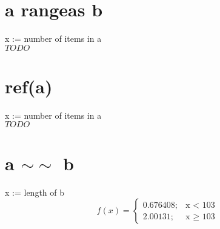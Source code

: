 \documentclass[12pt]{article}
\begin{document}
	\section{a rangeas b}
	x := number of items in a\\
	$TODO$
	
	\section{ref(a)}
	x := number of items in a\\
	$TODO$
	
	\section{a $\sim\sim$ b}
	x := length of b
	\begin{displaymath}
		f(x) = \left\{
			\begin{array}{lr}
				0.676408; & \text{x $<$ 103}\\
				2.00131; & \text{x $\geq$ 103}
			\end{array}
		\right.
	\end{displaymath}
\end{document}
